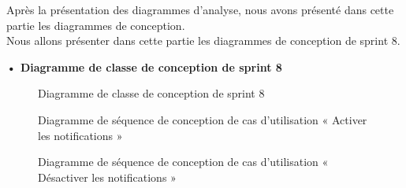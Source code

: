 Après la présentation des diagrammes d'analyse, nous avons présenté dans cette partie les diagrammes de conception.\\ 
Nous allons présenter dans cette partie les diagrammes de conception de sprint 8. \\
\begin{landscape}

\textbf{•	Diagramme de classe de conception de sprint 8}

\begin{figure}[H]
  \centering
  \caption{Diagramme de classe de conception de sprint 8}
  \label{fig:class_diagram_8}
\end{figure}
\end{landscape}

\begin{figure}[H]
  \centering
  \caption{Diagramme de séquence de conception de cas d'utilisation « Activer les notifications »}
  \label{fig:sequence_conception_activate_notification}
\end{figure}

\begin{figure}[H]
  \centering
  \caption{Diagramme de séquence de conception de cas d'utilisation « Désactiver les notifications »}
  \label{fig:sequence_conception_deactivate_notification}
\end{figure}

